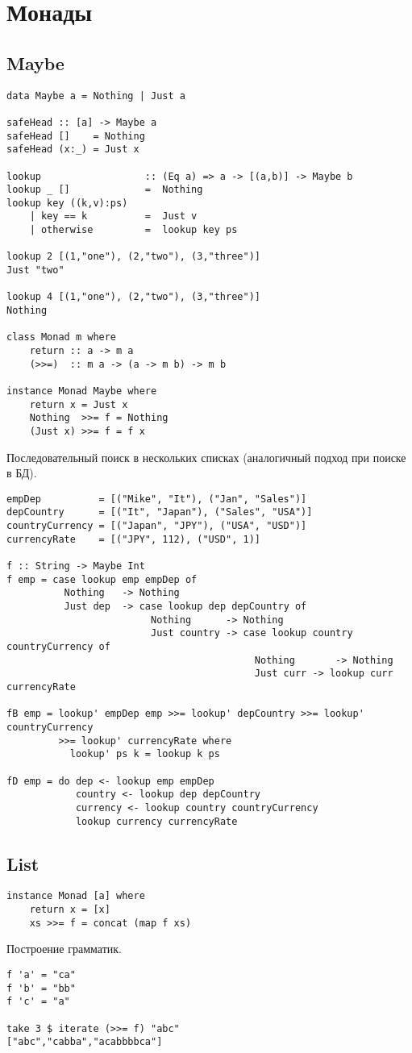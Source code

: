 \documentclass[a4paper,10pt]{article}
\begin{document}
\section{Монады}
\subsection{Maybe}
\begin{lstlisting}
data Maybe a = Nothing | Just a

safeHead :: [a] -> Maybe a
safeHead []    = Nothing
safeHead (x:_) = Just x

lookup                  :: (Eq a) => a -> [(a,b)] -> Maybe b
lookup _ []             =  Nothing
lookup key ((k,v):ps)
    | key == k          =  Just v
    | otherwise         =  lookup key ps

lookup 2 [(1,"one"), (2,"two"), (3,"three")]
Just "two"

lookup 4 [(1,"one"), (2,"two"), (3,"three")]
Nothing

class Monad m where
    return :: a -> m a
    (>>=)  :: m a -> (a -> m b) -> m b

instance Monad Maybe where
    return x = Just x
    Nothing  >>= f = Nothing
    (Just x) >>= f = f x
\end{lstlisting}
\clearpage
Последовательный поиск в нескольких списках (аналогичный подход при поиске в БД).
\begin{lstlisting}
empDep          = [("Mike", "It"), ("Jan", "Sales")]
depCountry      = [("It", "Japan"), ("Sales", "USA")]
countryCurrency = [("Japan", "JPY"), ("USA", "USD")]
currencyRate    = [("JPY", 112), ("USD", 1)]

f :: String -> Maybe Int
f emp = case lookup emp empDep of
          Nothing   -> Nothing
          Just dep  -> case lookup dep depCountry of
                         Nothing      -> Nothing
                         Just country -> case lookup country countryCurrency of
                                           Nothing       -> Nothing
                                           Just curr -> lookup curr currencyRate

fB emp = lookup' empDep emp >>= lookup' depCountry >>= lookup' countryCurrency
         >>= lookup' currencyRate where
           lookup' ps k = lookup k ps

fD emp = do dep <- lookup emp empDep
            country <- lookup dep depCountry
            currency <- lookup country countryCurrency
            lookup currency currencyRate
\end{lstlisting}

\subsection{List}
\begin{lstlisting}
instance Monad [a] where
    return x = [x]
    xs >>= f = concat (map f xs)
\end{lstlisting}

Построение грамматик.
\begin{lstlisting}
f 'a' = "ca"
f 'b' = "bb"
f 'c' = "a"

take 3 $ iterate (>>= f) "abc"
["abc","cabba","acabbbbca"]


\end{lstlisting}
\end{document}
